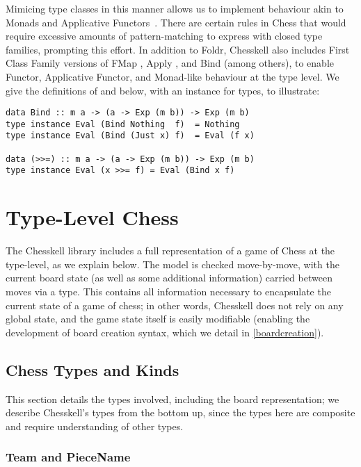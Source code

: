 Mimicing type classes in this manner allows us to implement behaviour akin to Monads and Applicative Functors~\cite{applicatives}. There are certain rules in Chess that would require excessive amounts of pattern-matching to express with closed type families, prompting this effort. In addition to Foldr, Chesskell also includes First Class Family versions of FMap \inline{(<\$>)}, Apply \inline{<*>}, and Bind \inline{(>>=)} (among others), to enable Functor, Applicative Functor, and Monad-like behaviour at the type level. We give the definitions of  and \inline{(>>=)} below, with an  instance for  types, to illustrate:

\begin{lstlisting}
data Bind :: m a -> (a -> Exp (m b)) -> Exp (m b)
type instance Eval (Bind Nothing  f)  = Nothing
type instance Eval (Bind (Just x) f)  = Eval (f x)

data (>>=) :: m a -> (a -> Exp (m b)) -> Exp (m b)
type instance Eval (x >>= f) = Eval (Bind x f)
\end{lstlisting}

\section{Type-Level Chess}

The Chesskell library includes a full representation of a game of Chess at the type-level, as we explain below. The model is checked move-by-move, with the current board state (as well as some additional information) carried between moves via a  type. This  contains all information necessary to encapsulate the current state of a game of chess; in other words, Chesskell does not rely on any global state, and the game state itself is easily modifiable (enabling the development of board creation syntax, which we detail in \cref{boardcreation}).

\subsection{Chess Types and Kinds}

This section details the types involved, including the board representation; we describe Chesskell's types from the bottom up, since the types here are composite and require understanding of other types.

\subsubsection{Team and PieceName}

